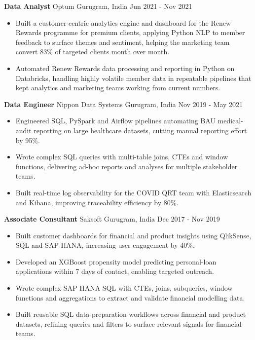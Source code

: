 \documentclass[10pt,a4paper]{article}
\newcommand{\role}[4]{\textbf{#1} \textbar{} #2 \hfill #3 \textbar{} #4\par}
\begin{document}
\vspace{3pt}
\role{Data Analyst}{Optum}{Gurugram, India}{Jun 2021 - Nov 2021}
\begin{itemize}
  \item Built a customer-centric analytics engine and dashboard for the Renew Rewards programme for premium clients, applying Python NLP to member feedback to surface themes and sentiment, helping the marketing team convert 83\% of targeted clients month over month.
  \item Automated Renew Rewards data processing and reporting in Python on Databricks, handling highly volatile member data in repeatable pipelines that kept analytics and marketing teams working from current numbers.
\end{itemize}
\vspace{3pt}
\role{Data Engineer}{Nippon Data Systems}{Gurugram, India}{Nov 2019 - May 2021}
\begin{itemize}
  \item Engineered SQL, PySpark and Airflow pipelines automating BAU medical-audit reporting on large healthcare datasets, cutting manual reporting effort by 95\%.
  \item Wrote complex SQL queries with multi-table joins, CTEs and window functions, delivering ad-hoc reports and analyses for multiple stakeholder teams.
  \item Built real-time log observability for the COVID QRT team with Elasticsearch and Kibana, improving traceability efficiency by 80\%.
\end{itemize}
\vspace{3pt}
\role{Associate Consultant}{Saksoft}{Gurugram, India}{Dec 2017 - Nov 2019}
\begin{itemize}
  \item Built customer dashboards for financial and product insights using QlikSense, SQL and SAP HANA, increasing user engagement by 40\%.
  \item Developed an XGBoost propensity model predicting personal-loan applications within 7 days of contact, enabling targeted outreach.
  \item Wrote complex SAP HANA SQL with CTEs, joins, subqueries, window functions and aggregations to extract and validate financial modelling data.
  \item Built reusable SQL data-preparation workflows across financial and product datasets, refining queries and filters to surface relevant signals for financial teams.
\end{itemize}
\end{document}
